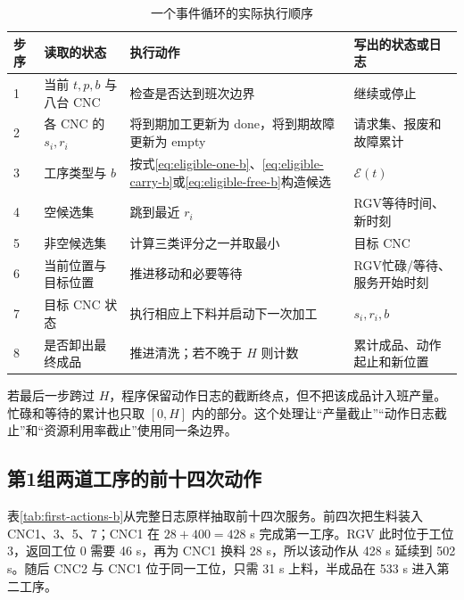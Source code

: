 \documentclass[UTF8,11pt,a4paper]{ctexart}
\begin{document}
\begin{table}[H]
\centering
\caption{一个事件循环的实际执行顺序}
\label{tab:event-loop-b}
\small
\begin{tabularx}{\textwidth}{p{1.1cm}p{4.2cm}p{5.0cm}X}
\toprule
步序 & 读取的状态 & 执行动作 & 写出的状态或日志\\
\midrule
1 & 当前 $t,p,b$ 与八台 CNC & 检查是否达到班次边界 & 继续或停止\\
2 & 各 CNC 的 $s_i,r_i$ & 将到期加工更新为 done，将到期故障更新为 empty & 请求集、报废和故障累计\\
3 & 工序类型与 $b$ & 按式\eqref{eq:eligible-one-b}、\eqref{eq:eligible-carry-b}或\eqref{eq:eligible-free-b}构造候选 & $\mathcal E(t)$\\
4 & 空候选集 & 跳到最近 $r_i$ & RGV等待时间、新时刻\\
5 & 非空候选集 & 计算三类评分之一并取最小 & 目标 CNC\\
6 & 当前位置与目标位置 & 推进移动和必要等待 & RGV忙碌/等待、服务开始时刻\\
7 & 目标 CNC 状态 & 执行相应上下料并启动下一次加工 & $s_i,r_i,b$\\
8 & 是否卸出最终成品 & 推进清洗；若不晚于 $H$ 则计数 & 累计成品、动作起止和新位置\\
\bottomrule
\end{tabularx}
\end{table}

若最后一步跨过 $H$，程序保留动作日志的截断终点，但不把该成品计入班产量。忙碌和等待的累计也只取 $[0,H]$ 内的部分。这个处理让“产量截止”“动作日志截止”和“资源利用率截止”使用同一条边界。

\subsection{第1组两道工序的前十四次动作}

表\ref{tab:first-actions-b}从完整日志原样抽取前十四次服务。前四次把生料装入 CNC1、3、5、7；CNC1 在 $28+400=428$ s 完成第一工序。RGV 此时位于工位 3，返回工位 0 需要 46 s，再为 CNC1 换料 28 s，所以该动作从 428 s 延续到 502 s。随后 CNC2 与 CNC1 位于同一工位，只需 31 s 上料，半成品在 533 s 进入第二工序。
\end{document}
